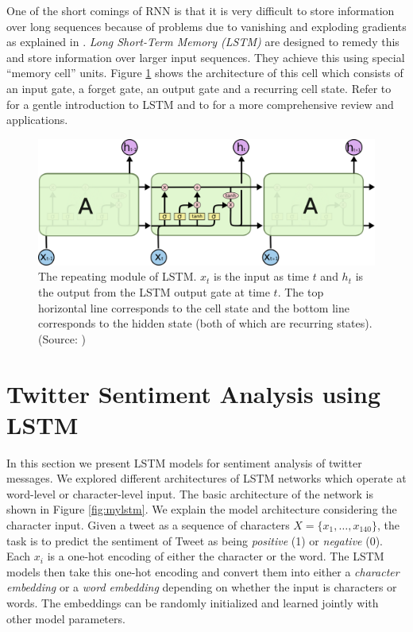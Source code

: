 \documentclass{article} %
\begin{document}
One of the short comings of RNN is that it is very difficult to store information over long sequences because of problems due to vanishing and exploding gradients as explained in \cite{hochreiter2001gradient}.
{\it Long Short-Term Memory (LSTM)} \cite{hochreiter1997long} are designed to remedy this and store information over larger input sequences.
They achieve this using special ``memory cell'' units. 
Figure \ref{fig:lstm} shows the architecture of this cell which consists of an input gate, a forget gate, an output gate and a recurring cell state. 
Refer to \cite{colah} for a gentle introduction to LSTM and to \cite{graves2012supervised} for a more comprehensive review and applications.

\begin{figure}
	\centering
	\includegraphics[width=\textwidth]{figs/LSTM.png}
	\caption{The repeating module of LSTM. $x_t$ is the input as time $t$ and $h_t$ is the output from the LSTM output gate at time $t$. The top horizontal line corresponds to the cell state and the bottom line corresponds to the hidden state (both of which are recurring states).
	(Source: \cite{colah})}
	\label{fig:lstm}
\end{figure}


\section{Twitter Sentiment Analysis using LSTM}
In this section we present LSTM models for sentiment analysis of twitter messages. We explored different architectures of LSTM networks which operate at word-level or character-level input. The basic architecture of the network is shown in Figure \ref{fig:mylstm}.
We explain the model architecture considering the character input.
Given a tweet as a sequence of characters $X=\{x_1, \ldots, x_{140}\}$, the task is to predict the sentiment of Tweet as being {\it positive} (1) or {\it negative} (0). Each $x_i$ is a one-hot encoding of either the character or the word. The LSTM models then take this one-hot encoding and convert them into either a {\it character embedding} or a {\it word embedding} depending on whether the input is characters or words. The embeddings can be randomly initialized and learned jointly with other model parameters.
\end{document}
